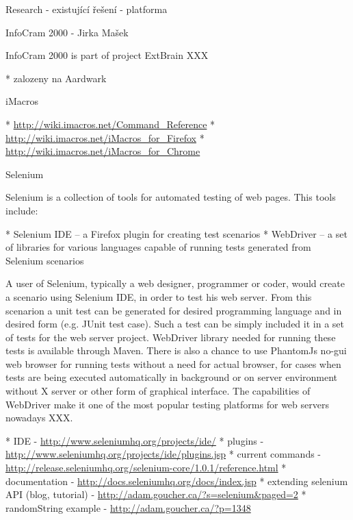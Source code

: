 \sec Research - existující řešení - platforma


\secc InfoCram 2000 - Jirka Mašek

InfoCram 2000 is part of project ExtBrain XXX


\begitems
  * zalozeny na Aardwark 
\enditems


\secc iMacros

\begitems
  * \url{http://wiki.imacros.net/Command_Reference}
  * \url{http://wiki.imacros.net/iMacros_for_Firefox}
  * \url{http://wiki.imacros.net/iMacros_for_Chrome}
\enditems



%



\secc Selenium

Selenium is a collection of tools for automated testing of web pages. This tools include: 

\begitems
  * Selenium IDE -- a Firefox plugin for creating test scenarios
  * WebDriver -- a set of libraries for various languages capable of running
    tests generated from Selenium scenarios
\enditems

A user of Selenium, typically a web designer, programmer or coder, would create
a scenario using Selenium IDE, in order to test his web server. From this
scenarion a unit test can be generated for desired programming language and in
desired form (e.g. JUnit test case). Such a test can be simply included it in a
set of tests for the web server project. WebDriver library needed for running
these tests is available through Maven. There is also a chance to use PhantomJs
no-gui web browser for running tests without a need for actual browser, for
cases when tests are being executed automatically in background or on server
environment without X server or other form of graphical interface. The
capabilities of WebDriver make it one of the most popular testing platforms for
web servers nowadays XXX. 

\begitems
  * IDE - \url{http://www.seleniumhq.org/projects/ide/}
  * plugins - \url{http://www.seleniumhq.org/projects/ide/plugins.jsp}
  * current commands - \url{http://release.seleniumhq.org/selenium-core/1.0.1/reference.html}
  * documentation - \url{http://docs.seleniumhq.org/docs/index.jsp}
  * extending selenium API (blog, tutorial) - \url{http://adam.goucher.ca/?s=selenium&paged=2}
  \begitems
    * randomString example - \url{http://adam.goucher.ca/?p=1348}
  \enditems
\enditems

